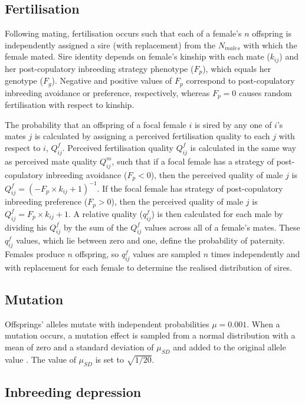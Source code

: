\documentclass[12pt]{article}
\begin{document}
\subsection*{Fertilisation}

Following mating, fertilisation occurs such that each of a female's $n$ offspring is independently assigned a sire (with replacement) from the $N_{males}$ with which the female mated. Sire identity depends on female's kinship with each mate ($k_{ij}$) and her post-copulatory inbreeding strategy phenotype ($F_{p}$), which equals her genotype ($F_{g}$). Negative and positive values of $F_{p}$ correspond to post-copulatory inbreeding avoidance or preference, respectively, whereas $F_{p}=0$ causes random fertilisation with respect to kinship.

The probability that an offspring of a focal female $i$ is sired by any one of $i$'s mates $j$ is calculated by assigning a perceived fertilisation quality to each $j$ with respect to $i$, $Q^{f}_{ij}$. Perceived fertilisation quality $Q^{f}_{ij}$ is calculated in the same way as perceived mate quality $Q^{m}_{ij}$, such that if a focal female has a strategy of post-copulatory inbreeding avoidance ($F_{p}<0$), then the perceived quality of male $j$ is $Q^{f}_{ij} = (-F_{p} \times k_{ij} + 1)^{-1}$. If the focal female has strategy of post-copulatory inbreeding preference ($F_{p}>0$), then the perceived quality of male $j$ is $Q^{f}_{ij} = F_{p} \times k_{ij} + 1$. A relative quality ($q^{f}_{ij}$) is then calculated for each male by dividing his $Q^{f}_{ij}$ by the sum of the $Q^{f}_{ij}$ values across all of a female's mates. These $q^{f}_{ij}$ values, which lie between zero and one, define the probability of paternity. Females produce $n$ offspring, so $q^{f}_{ij}$ values are sampled $n$ times independently and with replacement for each female to determine the realised distribution of sires. 

\subsection*{Mutation}

Offsprings' alleles mutate with independent probabilities $\mu=0.001$. When a mutation occurs, a mutation effect is sampled from a normal distribution with a mean of zero and a standard deviation of $\mu_{SD}$ and added to the original allele value \cite[][]{Kimura1965, Lande1976, Bocedi2014, Duthie}. The value of $\mu_{SD}$ is set to $\sqrt{1/20}$.

\subsection*{Inbreeding depression}
\end{document}
